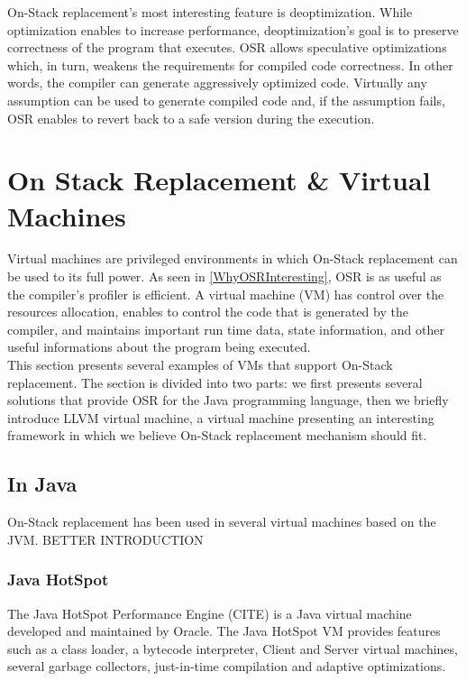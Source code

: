 On-Stack replacement's most interesting feature is deoptimization. 
While optimization enables to increase performance, deoptimization's goal is to preserve correctness of the program that executes.
OSR allows speculative optimizations which, in turn, weakens the requirements for compiled code correctness. 
In other words, the compiler can generate aggressively optimized code. 
Virtually any assumption can be used to generate compiled code and, if the assumption fails, 
OSR enables to revert back to a safe version during the execution.\\

\section{On Stack Replacement \& Virtual Machines}
Virtual machines are privileged environments in which On-Stack replacement can be used to its full power.
As seen in \ref{WhyOSRInteresting}, OSR is as useful as the compiler's profiler is efficient.
A virtual machine (VM) has control over the resources allocation, enables to control the code that is generated by the compiler, and maintains important run time data, state information, and other useful informations about the program being executed.\\

This section presents several examples of VMs that support On-Stack replacement. 
The section is divided into two parts: we first presents several solutions that provide OSR for  the Java programming language, then we briefly introduce LLVM virtual machine, a virtual machine presenting an interesting framework in which we believe On-Stack replacement mechanism should fit.\\ 
\subsection{In Java}
On-Stack replacement has been used in several virtual machines based on the JVM.
BETTER INTRODUCTION\\

\subsubsection{Java HotSpot}
The Java HotSpot Performance Engine (CITE) is a Java virtual machine developed and maintained by Oracle.
The Java HotSpot VM provides features such as a class loader, a bytecode interpreter, Client and Server virtual machines, several garbage collectors, just-in-time compilation and adaptive optimizations.\\


